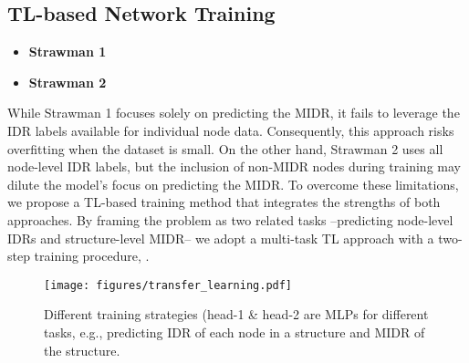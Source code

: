 \subsection{TL-based Network Training}
\label{subsec:transfer_learning}
\begin{itemize}
    \item {\textbf{Strawman 1}} 
    \item {\textbf{Strawman 2}} 
\end{itemize}

While Strawman 1 focuses solely on predicting the MIDR, it fails to leverage the IDR labels available for individual node data. Consequently, this approach risks overfitting when the dataset is small. On the other hand, Strawman 2 uses all node-level IDR labels, but the inclusion of non-MIDR nodes during training may dilute the model's focus on predicting the MIDR. To overcome these limitations, we propose a TL-based training method that integrates the strengths of both approaches. By framing the problem as two related tasks --predicting node-level IDRs and structure-level MIDR-- we adopt a multi-task TL approach with a two-step training procedure, . 
\begin{figure}[h!]
    \centering
    \texttt{[image: figures/transfer\_learning.pdf]}
    \caption{Different training strategies (head-1 \& head-2 are MLPs for different tasks, e.g., predicting IDR of each node in a structure and MIDR of the structure.}
    \label{fig:transfer_learning}
\end{figure}

